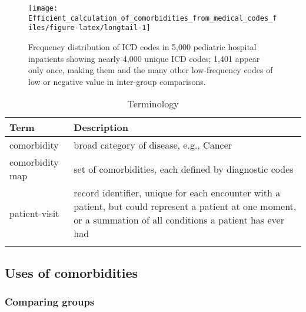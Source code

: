 \documentclass[article]{jss}
\begin{document}
\begin{CodeChunk}
\begin{figure}

{\centering \texttt{[image: Efficient\_calculation\_of\_comorbidities\_from\_medical\_codes\_files/figure-latex/longtail-1]} 

}

\caption[Frequency distribution of ICD codes in 5,000 pediatric hospital inpatients showing nearly 4,000 unique ICD codes]{Frequency distribution of ICD codes in 5,000 pediatric hospital inpatients showing nearly 4,000 unique ICD codes; 1,401 appear only once, making them and the many other low-frequency codes of low or negative value in inter-group comparisons.}\label{fig:longtail}
\end{figure}
\end{CodeChunk}

\begin{longtable}[t]{l|p{10 cm}}
\hline
Term & Description\\
\hline
comorbidity & broad category of disease, e.g., Cancer\\
\hline
comorbidity map & set of comorbidities, each defined by diagnostic codes\\
\hline
patient-visit & record identifier, unique for each encounter with a patient, but could represent a patient at one moment, or a summation of all conditions a patient has ever had\\
\hline
\caption{\label{tab:terminology}Terminology}\\
\end{longtable}

\subsection{Uses of comorbidities}\label{uses-of-comorbidities}

\subsubsection{Comparing groups}\label{comparing-groups}
\end{document}
